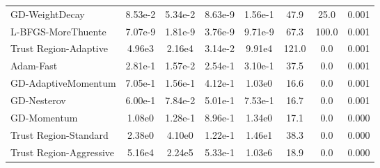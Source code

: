 \documentclass{article}
\begin{document}
\begin{table}[htbp]
{\begin{tabular}{p{2.5cm}*{7}{c}}
GD-WeightDecay & 8.53e-2 & 5.34e-2 & 8.63e-9 & 1.56e-1 & 47.9 & 25.0 & 0.001 \\
L-BFGS-MoreThuente & 7.07e-9 & 1.81e-9 & 3.76e-9 & 9.71e-9 & 67.3 & 100.0 & 0.001 \\
Trust Region-Adaptive & 4.96e3 & 2.16e4 & 3.14e-2 & 9.91e4 & 121.0 & 0.0 & 0.001 \\
Adam-Fast & 2.81e-1 & 1.57e-2 & 2.54e-1 & 3.10e-1 & 37.5 & 0.0 & 0.001 \\
GD-AdaptiveMomentum & 7.05e-1 & 1.56e-1 & 4.12e-1 & 1.03e0 & 16.6 & 0.0 & 0.001 \\
GD-Nesterov & 6.00e-1 & 7.84e-2 & 5.01e-1 & 7.53e-1 & 16.7 & 0.0 & 0.001 \\
GD-Momentum & 1.08e0 & 1.28e-1 & 8.96e-1 & 1.34e0 & 17.1 & 0.0 & 0.000 \\
Trust Region-Standard & 2.38e0 & 4.10e0 & 1.22e-1 & 1.46e1 & 38.3 & 0.0 & 0.000 \\
Trust Region-Aggressive & 5.16e4 & 2.24e5 & 5.33e-1 & 1.03e6 & 18.9 & 0.0 & 0.000 \\
\bottomrule
\end{tabular}
}
\end{table}
\end{document}
